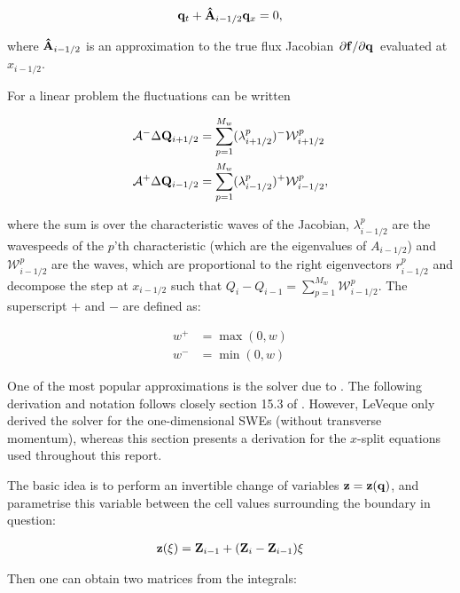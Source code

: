 \begin{align}
  \vb q_t + \vu A_{i-1/2} \vb q_x = 0,
\end{align}

where $\vu A_{i-1/2}$ is an approximation to the true flux Jacobian $\pdv*{\vb f}{\vb q}$ evaluated at $x_{i-1/2}$.

For a linear problem the fluctuations can be written

\begin{subequations}
  \label{eq:approx_fluct}
\begin{align}
  \mathcal{A}^- \Delta \vb Q_{i+1/2} &= \sum_{p=1}^{M_w} (\lambda_{i+1/2}^p)^- \mathcal{W}_{i+1/2}^p \\
  \mathcal{A}^+ \Delta \vb Q_{i-1/2} &= \sum_{p=1}^{M_w} (\lambda_{i-1/2}^p)^+ \mathcal{W}_{i-1/2}^p,
\end{align}
\end{subequations}

where the sum is over the characteristic waves of the Jacobian, $\lambda_{i-1/2}^p$ are the wavespeeds of the $p$'th characteristic (which are the eigenvalues of $A_{i-1/2}$) and $\mathcal{W}_{i-1/2}^p$ are the waves, which are proportional to the right eigenvectors $r_{i-1/2}^p$ and decompose the step at $x_{i-1/2}$ such that $Q_i - Q_{i-1} = \sum_{p=1}^{M_w} \mathcal{W}_{i-1/2}^p$. The superscript $+$ and $-$ are defined as:

\begin{align}
  w^+ &= \max(0, w) \\
  w^- &= \min(0, w)
\end{align}

One of the most popular approximations is the solver due to \citet{roe1981approximate}. The following derivation and notation follows closely section 15.3 of \cite{leveque2002finite}. However, LeVeque only derived the solver for the one-dimensional SWEs (without transverse momentum), whereas this section presents a derivation for the $x$-split equations used throughout this report.

The basic idea is to perform an invertible change of variables $\vb z = \vb z(\vb q)$, and parametrise this variable between the cell values surrounding the boundary in question:

\begin{align}
  \vb z(\xi) = \vb Z_{i-1} + (\vb Z_i - \vb Z_{i-1})\xi
\end{align}

Then one can obtain two matrices from the integrals:

